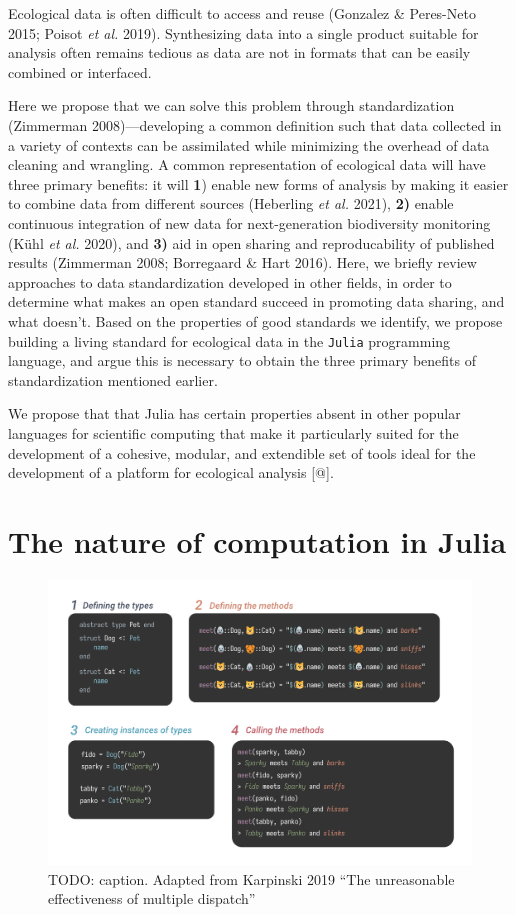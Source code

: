 \documentclass[10pt,oneside]{article}
\makeatletter
\def\maxwidth{\ifdim\Gin@nat@width>\linewidth\linewidth
\else\Gin@nat@width\fi}
\let\Oldincludegraphics\includegraphics
\renewcommand{\includegraphics}[1]{\Oldincludegraphics[width=\maxwidth]{#1}}
\makeatother
\begin{document}
Ecological data is often difficult to access and reuse (Gonzalez \&
Peres-Neto 2015; Poisot \emph{et al.} 2019). Synthesizing data into a
single product suitable for analysis often remains tedious as data are
not in formats that can be easily combined or interfaced.

Here we propose that we can solve this problem through standardization
(Zimmerman 2008)---developing a common definition such that data
collected in a variety of contexts can be assimilated while minimizing
the overhead of data cleaning and wrangling. A common representation of
ecological data will have three primary benefits: it will \textbf{1})
enable new forms of analysis by making it easier to combine data from
different sources (Heberling \emph{et al.} 2021), \textbf{2)} enable
continuous integration of new data for next-generation biodiversity
monitoring (Kühl \emph{et al.} 2020), and \textbf{3)} aid in open
sharing and reproducability of published results (Zimmerman 2008;
Borregaard \& Hart 2016). Here, we briefly review approaches to data
standardization developed in other fields, in order to determine what
makes an open standard succeed in promoting data sharing, and what
doesn't. Based on the properties of good standards we identify, we
propose building a living standard for ecological data in the
\texttt{Julia} programming language, and argue this is necessary to
obtain the three primary benefits of standardization mentioned earlier.

We propose that that Julia has certain properties absent in other
popular languages for scientific computing that make it particularly
suited for the development of a cohesive, modular, and extendible set of
tools ideal for the development of a platform for ecological analysis
{[}@{]}.

\hypertarget{the-nature-of-computation-in-julia}{%
\section{The nature of computation in
Julia}\label{the-nature-of-computation-in-julia}}

\begin{figure}
\centering
\includegraphics{./figures/multiple_dispatch.png}
\caption{TODO: caption. Adapted from Karpinski 2019 ``The unreasonable
effectiveness of multiple dispatch''}
\end{figure}
\end{document}
